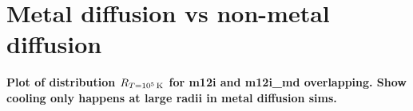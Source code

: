 \documentclass[fleqn,usenatbib]{mnras}
\newcommand{\Rcool}{R_{T=10^5\,{\rm K}}}
\begin{document}
\section{Metal diffusion vs non-metal diffusion}

\textbf{Plot of distribution $\Rcool$ for m12i and m12i\_md overlapping. Show cooling only happens at large radii in metal diffusion sims.}



\bsp	%
\label{lastpage}
\end{document}
